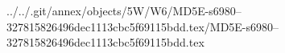 ../../.git/annex/objects/5W/W6/MD5E-s6980--327815826496dec1113cbc5f69115bdd.tex/MD5E-s6980--327815826496dec1113cbc5f69115bdd.tex